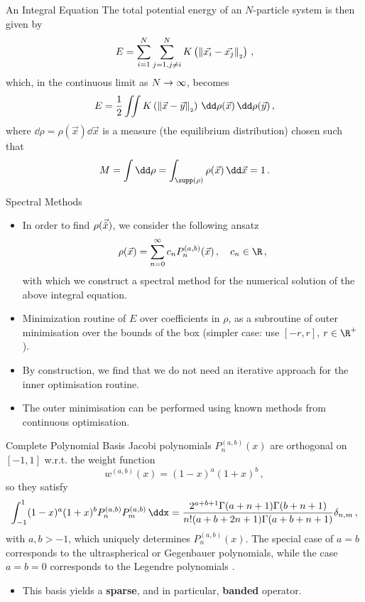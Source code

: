 \documentclass[aspectratio=169, hyperref={colorlinks=true}]{beamer}
\begin{document}
  \begin{frame}{An Integral Equation}
    \vspace{0.4cm}
    The total potential energy of an $N$-particle system is then given by
    $$E = \sum_{i=1}^{N} \sum_{j=1, j \neq i}^{N} K\left(\left\lVert\vec{x_i} - \vec{x_j}\right\rVert_{\scriptscriptstyle 2}\right)\,,$$
    which, in the continuous limit as $N \rightarrow \infty$, becomes
    $$E = \frac{1}{2} \iint K\left(\norm{\vec{x} - \vec{y}}\right) \,\dd\rho(\vec{x})\,\dd\rho(\vec{y})\,,$$
    where $\dd\rho = \rho(\vec{x})\dd\vec{x}$ is a measure (the equilibrium distribution) chosen such that
    $$M = \int \dd\rho = \int_{\supp(\rho)} \rho(\vec{x}) \,\dd\vec{x} = 1\,.$$
  \end{frame}

  \begin{frame}{Spectral Methods}
    \begin{itemize}
      \item In order to find $\rho(\vec{\hat{x}})$, we consider the following ansatz
            $$\rho(\vec{x}) = \sum_{n=0}^{\infty} c_n P_n^{(a,b)}(\vec{x})\,,\quad c_n \in \R\,,$$
            with which we construct a spectral method for the numerical solution of the above integral equation.
      \item Minimization routine of $E$ over coefficients in $\rho$, as a subroutine of outer minimisation over the bounds of the box (simpler case: use $[-r, r]$, $r \in \R^+$).
      \item By construction, we find that we do not need an iterative approach for the inner optimisation routine.
      \item The outer minimisation can be performed using known methods from continuous optimisation.
    \end{itemize}
  \end{frame}

  \begin{frame}{Complete Polynomial Basis}
    Jacobi polynomials $P_n^{(a,b)}(x)$ are orthogonal on $[-1,1]$ w.r.t. the weight function
    \begin{equation*}
      w^{(a,b)}(x)=(1-x)^a (1+x)^b\,,
    \end{equation*}
    so they satisfy
    \begin{align*}\label{eq:orthogonalityconditionJacobi}
      \int_{-1}^1(1-x)^a(1+x)^bP_n^{(a,b)}P_m^{(a,b)}\,\ddx = \frac{2^{a+b+1} \Gamma (a+n+1) \Gamma (b+n+1)}{n! (a+b+2 n+1) \Gamma (a+b+n+1)} \delta_{n,m}\,,
    \end{align*}
    with $a	,b>-1$, which uniquely determines $P_n^{(a,b)}(x)$. The special case of $a=b$ corresponds to the ultraspherical or Gegenbauer polynomials, while the case $a=b=0$ corresponds to the Legendre polynomials \cite{2018-nist}.

    \begin{itemize}
      \item This basis yields a \textbf{sparse}, and in particular, \textbf{banded} operator.
    \end{itemize}
  \end{frame}
\end{document}
